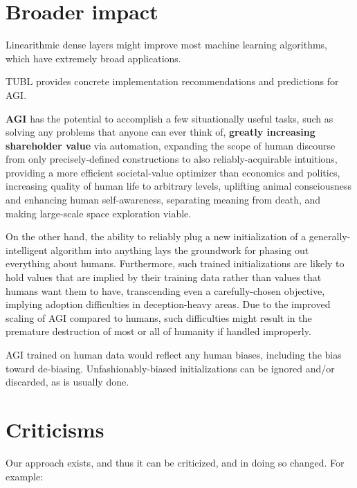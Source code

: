 \documentclass{article}
\begin{document}
\section{Broader impact}


Linearithmic dense layers might improve most machine learning algorithms, which have extremely broad applications.

TUBL provides concrete implementation recommendations and predictions for AGI.

\textbf{AGI} has the potential to accomplish a few situationally useful tasks, such as solving any problems that anyone can ever think of, \textbf{greatly increasing shareholder value} via automation, expanding the scope of human discourse from only precisely-defined constructions to also reliably-acquirable intuitions, providing a more efficient societal-value optimizer than economics and politics, increasing quality of human life to arbitrary levels, uplifting animal consciousness and enhancing human self-awareness, separating meaning from death, and making large-scale space exploration viable.

On the other hand, the ability to reliably plug a new initialization of a generally-intelligent algorithm into anything lays the groundwork for phasing out everything about humans. Furthermore, such trained initializations are likely to hold values that are implied by their training data rather than values that humans want them to have, transcending even a carefully-chosen objective, implying adoption difficulties in deception-heavy areas. Due to the improved scaling of AGI compared to humans, such difficulties might result in the premature destruction of most or all of humanity if handled improperly.

AGI trained on human data would reflect any human biases, including the bias toward de-biasing. Unfashionably-biased initializations can be ignored and/or discarded, as is usually done.

\section{Criticisms}

Our approach exists, and thus it can be criticized, and in doing so changed. For example:
\end{document}
